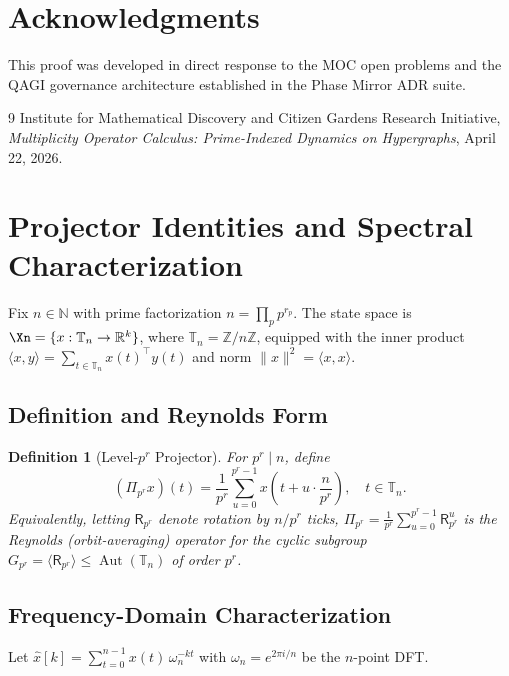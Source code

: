 \documentclass[11pt]{amsart}
\newtheorem{definition}[theorem]{Definition}
\newcommand{\Prj}{\Pi}
\newcommand{\Rp}{\mathsf{R}}
\newcommand{\Aut}{\operatorname{Aut}}
\newcommand{\R}{\mathbb{R}}
\newcommand{\Z}{\mathbb{Z}}
\newcommand{\N}{\mathbb{N}}
\newcommand{\Tn}{\mathbb{T}_n}
\newcommand{\norm}[1]{\lVert #1 \rVert}
\begin{document}
\section*{Acknowledgments}
This proof was developed in direct response to the MOC open problems and the QAGI governance architecture established in the Phase Mirror ADR suite.

\begin{thebibliography}{9}
  Institute for Mathematical Discovery and Citizen Gardens Research Initiative,
  \emph{Multiplicity Operator Calculus: Prime-Indexed Dynamics on Hypergraphs},
  April 22, 2026.
\end{thebibliography}

\appendix
\section{Projector Identities and Spectral Characterization}
\label{sec:projectors}

Fix $n \in \N$ with prime factorization $n = \prod_p p^{r_p}$. The state space is $\Xn = \{x : \Tn \to \R^k\}$, where $\Tn = \Z/n\Z$, equipped with the inner product $\langle x, y \rangle = \sum_{t \in \Tn} x(t)^\top y(t)$ and norm $\norm{x}^2 = \langle x, x\rangle$.

\subsection{Definition and Reynolds Form}

\begin{definition}[Level-$p^r$ Projector]\label{def:projector}
For $p^r \mid n$, define
\[
  (\Prj_{p^r} x)(t) = \frac{1}{p^r} \sum_{u=0}^{p^r - 1} x\!\left(t + u \cdot \frac{n}{p^r}\right), \quad t \in \Tn.
\]
Equivalently, letting $\Rp_{p^r}$ denote rotation by $n/p^r$ ticks, $\Prj_{p^r} = \frac{1}{p^r}\sum_{u=0}^{p^r-1} \Rp_{p^r}^u$ is the Reynolds (orbit-averaging) operator for the cyclic subgroup $G_{p^r} = \langle \Rp_{p^r} \rangle \leq \Aut(\Tn)$ of order $p^r$.
\end{definition}

\subsection{Frequency-Domain Characterization}

Let $\hat{x}[k] = \sum_{t=0}^{n-1} x(t)\,\omega_n^{-kt}$ with $\omega_n = e^{2\pi i/n}$ be the $n$-point DFT.
\end{document}
